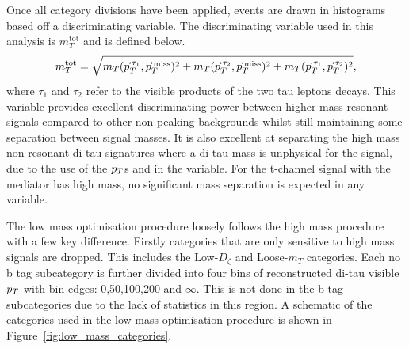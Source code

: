 Once all category divisions have been applied, events are drawn in histograms based off a discriminating variable.
The discriminating variable used in this analysis is $m_{T}^{\text{tot}}$ and is defined below.
\begin{equation}
m_{T}^\text{tot} = \sqrt{m_{T}(\vec{p}_{T}^{\hspace{2pt}\tau_1},\vec{p}_{T}^{\hspace{2pt}\text{miss}})^2 +  m_{T}(\vec{p}_{T}^{\hspace{2pt}\tau_2},\vec{p}_{T}^{\hspace{2pt}\text{miss}})^2 + m_{T}(\vec{p}_{T}^{\hspace{2pt}\tau_1},\vec{p}_{T}^{\hspace{2pt}\tau_2})^2},
\label{eqn:mt_tot}
\end{equation}
where $\tau_1$ and $\tau_2$ refer to the visible products of the two tau leptons decays.
This variable provides excellent discriminating power between higher mass resonant signals compared to other non-peaking backgrounds whilst still maintaining some separation between signal masses.
It is also excellent at separating the high mass non-resonant di-tau signatures where a di-tau mass is unphysical for the signal, due to the use of the $p_{T}$s and in the variable.
For the t-channel signal with the mediator has high mass, no significant mass separation is expected in any variable.

The low mass optimisation procedure loosely follows the high mass procedure with a few key difference.
Firstly categories that are only sensitive to high mass signals are dropped.
This includes the Low-$D_\zeta$ and Loose-$m_{T}$ categories.
Each no b tag subcategory is further divided into four bins of reconstructed di-tau visible $p_{T}$ with bin edges: 0,50,100,200 and $\infty$.
This is not done in the b tag subcategories due to the lack of statistics in this region.
A schematic of the categories used in the low mass optimisation procedure is shown in Figure~\ref{fig:low_mass_categories}.

